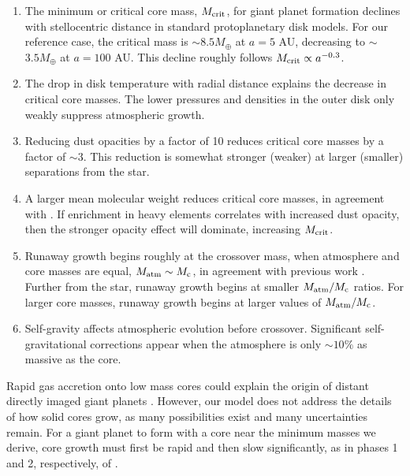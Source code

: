 \documentclass[apj, numberedappendix]{emulateapj}
\newcommand{\co}{_{\rm c}}
\newcommand{\MC}{M_{\rm crit}}
\begin{document}
\begin{enumerate}
\item The minimum or critical core mass, $\MC$, for giant planet formation declines with stellocentric distance in standard protoplanetary disk models.  For our reference case, the critical mass is $\sim$$8.5 M_{\oplus}$ at $a = 5$ AU, decreasing to $\sim$$3.5 M_{\oplus}$ at $a =100$ AU.  This decline roughly follows $\MC \propto a^{-0.3}$.

\item The drop in disk temperature with radial distance explains the decrease in critical core masses.  The lower pressures and densities in the outer disk only weakly suppress atmospheric growth.

\item Reducing dust opacities by a factor of 10 reduces critical core masses by a factor of $\sim$$3$.  This reduction is somewhat stronger (weaker) at larger (smaller) separations from the star.

\item A larger mean molecular weight reduces critical core masses, in agreement with \citet{HorIko11}.  If enrichment in heavy elements correlates with increased dust opacity, then the stronger opacity effect will dominate, increasing $\MC$.

\item Runaway growth begins roughly at the crossover mass, when atmosphere and core masses are equal, $M_{\rm atm} \sim M\co$, in agreement with previous work \citep{pollack96}.  Further from the star, runaway growth begins at smaller $M_{\rm atm} / M\co$ ratios.  For larger core masses, runaway growth begins at larger values of $M_{\rm atm} / M\co$.

\item Self-gravity affects atmospheric evolution before crossover.  Significant self-gravitational corrections appear when the atmosphere is only $\sim$$10 \%$ as massive as the core.

\end{enumerate}

Rapid gas accretion onto low mass cores could explain the origin of distant directly imaged giant planets \citep{marois08, lagrange10}.  However, our model does not address the details of how solid cores grow, as many possibilities exist and many uncertainties remain. %
For a giant planet to form with a core near the minimum masses we derive, core growth must  first be rapid and then slow significantly, as in phases 1 and 2, respectively, of \cite{pollack96}.
\end{document}
